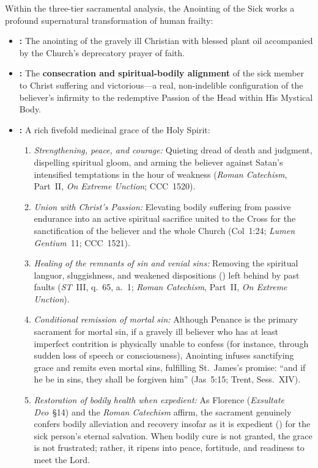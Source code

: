 Within the three-tier sacramental analysis, the Anointing of the Sick works a profound supernatural transformation of human frailty:
\begin{itemize}
  \item \textbf{:} The anointing of the gravely ill Christian with blessed plant oil accompanied by the Church's deprecatory prayer of faith.
  \item \textbf{:} The \textbf{consecration and spiritual-bodily alignment} of the sick member to Christ suffering and victorious---a real, non-indelible configuration of the believer's infirmity to the redemptive Passion of the Head within His Mystical Body.
  \item \textbf{:} A rich fivefold medicinal grace of the Holy Spirit:
  \begin{enumerate}
    \item \emph{Strengthening, peace, and courage:} Quieting dread of death and judgment, dispelling spiritual gloom, and arming the believer against Satan's intensified temptations in the hour of weakness (\emph{Roman Catechism}, Part~II, \emph{On Extreme Unction}; CCC~1520).
    \item \emph{Union with Christ's Passion:} Elevating bodily suffering from passive endurance into an active spiritual sacrifice united to the Cross for the sanctification of the believer and the whole Church (Col~1:24; \emph{Lumen Gentium}~11; CCC~1521).
    \item \emph{Healing of the remnants of sin and venial sins:} Removing the spiritual languor, sluggishness, and weakened dispositions () left behind by past faults (\emph{ST}~III, q.~65, a.~1; \emph{Roman Catechism}, Part~II, \emph{On Extreme Unction}).
    \item \emph{Conditional remission of mortal sin:} Although Penance is the primary sacrament for mortal sin, if a gravely ill believer who has at least imperfect contrition is physically unable to confess (for instance, through sudden loss of speech or consciousness), Anointing infuses sanctifying grace and remits even mortal sins, fulfilling St.~James's promise: ``and if he be in sins, they shall be forgiven him'' (Jas~5:15; Trent, Sess.~XIV).
    \item \emph{Restoration of bodily health when expedient:} As Florence (\emph{Exsultate Deo}~\S14) and the \emph{Roman Catechism} affirm, the sacrament genuinely confers bodily alleviation and recovery insofar as it is expedient () for the sick person's eternal salvation. When bodily cure is not granted, the grace is not frustrated; rather, it ripens into peace, fortitude, and readiness to meet the Lord.
  \end{enumerate}
\end{itemize}

